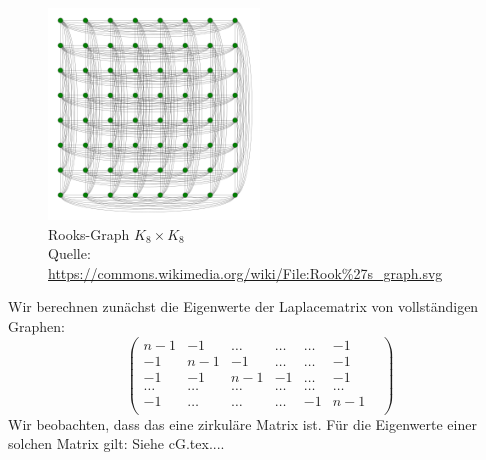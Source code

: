\begin{figure}[H]
  \centering
 \includegraphics[width=0.5\textwidth]{Rook's_graph.png}
 \caption*{Rooks-Graph $K_8\times K_8$ \\ \tiny{Quelle: \url{https://commons.wikimedia.org/wiki/File:Rook\%27s_graph.svg}}}
 \label{rook} %
\end{figure}
\begin{Bsps}
\end{Bsps}
Wir berechnen zunächst die Eigenwerte der Laplacematrix von vollständigen Graphen:
\begin{equation}
\begin{pmatrix}
n-1&-1&\ldots&\ldots&\ldots&-1\\
-1&n-1&-1&\ldots&\ldots&-1\\
-1&-1&n-1&-1&\ldots&-1\\
\ldots&\ldots&\ldots&\ldots&\ldots&\ldots&\\
-1&\ldots&\ldots&\ldots&-1&n-1\\
\end{pmatrix}
\end{equation}
Wir beobachten, dass das eine zirkuläre Matrix ist. 
Für die Eigenwerte einer solchen Matrix gilt: Siehe cG.tex....

